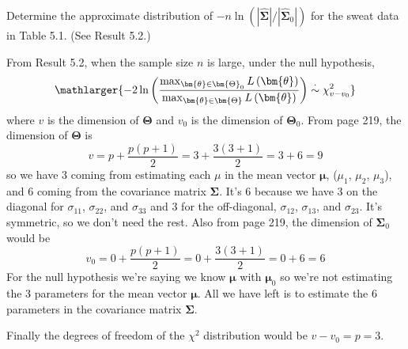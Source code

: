 Determine the approximate distribution of $-n \ln\left( |\hat{\bm{\Sigma}}|/ |\hat{\bm{\Sigma}}_{0}| \right)$ for the sweat data in
Table 5.1. (See Result 5.2.)
\newline
\par
From Result 5.2, when the sample size $n$ is large, under the null hypothesis,
\[
\mathlarger{
    -2 \ln \left(
        \frac{\max_{\bm{\theta} \in \bm{\Theta}_{0}} L\left(\bm{\theta}\right)}{\max_{\bm{\theta} \in \bm{\Theta}} L\left(\bm{\theta}\right)}
    \right)
    \overset{\cdot}{\sim}
    \chi_{v- v_{0}}^{2}
}
\]
where $v$ is the dimension of $\bm{\Theta}$ and $v_{0}$ is the dimension of $\bm{\Theta}_{0}$.
From page 219, the dimension of $\bm{\Theta}$ is
\[
    v
    =
    p +\frac{p(p+1)}{2}
    =
    3 + \frac{3(3+1)}{2}
    =
    3 + 6
    =
    9
\]
so we have 3 coming from estimating each $\mu$ in the mean vector $\bm{\mu}$, ($\mu_{1}$, $\mu_{2}$, $\mu_{3}$), and 6 coming from the covariance matrix $\bm{\Sigma}$. It's 6 because we have 3 on the diagonal for $\sigma_{11}$, $\sigma_{22}$, and $\sigma_{33}$ and 3 for the off-diagonal, $\sigma_{12}$, $\sigma_{13}$, and $\sigma_{23}$. It's symmetric, so we don't need the rest. Also from page 219, the dimension of $\bm{\Sigma}_{0}$ would be
\[
    v_{0}
    =
    0 +\frac{p(p+1)}{2}
    =
    0 + \frac{3(3+1)}{2}
    =
    0 + 6
    =
    6
\]
For the null hypothesis we're saying we know $\bm{\mu}$ with $\bm{\mu}_{0}$ so we're not estimating the 3 parameters for the mean vector $\bm{\mu}$. All we have left is to estimate the 6 parameters in the covariance matrix $\bm{\Sigma}$.

Finally the degrees of freedom of the $\chi^2$ distribution would be $v - v_{0} = p = 3$.